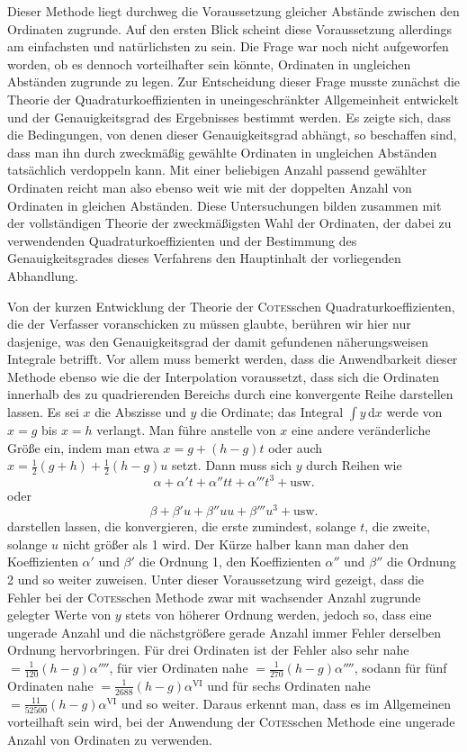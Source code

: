 Dieser Methode liegt durchweg die Voraussetzung gleicher Abstände zwischen den Ordinaten zugrunde. Auf den ersten Blick scheint diese Voraussetzung allerdings am einfachsten und natürlichsten zu sein. Die Frage war noch nicht aufgeworfen worden, ob es dennoch vorteilhafter sein könnte, Ordinaten in ungleichen Abständen zugrunde zu legen. Zur Entscheidung dieser Frage musste zunächst die Theorie der Quadraturkoeffizienten in uneingeschränkter Allgemeinheit entwickelt und der Genauigkeitsgrad des Ergebnisses bestimmt werden. Es zeigte sich, dass die Bedingungen, von denen dieser Genauigkeitsgrad abhängt, so beschaffen sind, dass man ihn durch zweckmäßig gewählte Ordinaten in ungleichen Abständen tatsächlich verdoppeln kann. Mit einer beliebigen Anzahl passend gewählter Ordinaten reicht man also ebenso weit wie mit der doppelten Anzahl von Ordinaten in gleichen Abständen. Diese Untersuchungen bilden zusammen mit der vollständigen Theorie der zweckmäßigsten Wahl der Ordinaten, der dabei zu verwendenden Quadraturkoeffizienten und der Bestimmung des Genauigkeitsgrades dieses Verfahrens den Hauptinhalt der vorliegenden Abhandlung.

Von der kurzen Entwicklung der Theorie der \textsc{Cotes}schen Quadraturkoeffizienten, die der Verfasser voranschicken zu müssen glaubte, berühren wir hier nur dasjenige, was den Genauigkeitsgrad der damit gefundenen näherungsweisen Integrale betrifft. Vor allem muss bemerkt werden, dass die Anwendbarkeit dieser Methode ebenso wie die der Interpolation voraussetzt, dass sich die Ordinaten innerhalb des zu quadrierenden Bereichs
durch eine konvergente Reihe darstellen lassen. Es sei \(x\) die Abszisse und \(y\) die Ordinate; das Integral \(\int y\,\mathrm{d}x\) werde von \(x=g\) bis \(x=h\) verlangt. Man führe anstelle von \(x\) eine andere veränderliche Größe ein, indem man etwa \(x=g+(h-g)t\) oder auch \(x=\frac12(g+h)+\frac12(h-g)u\) setzt. Dann muss sich \(y\) durch Reihen wie
\[
\alpha+\alpha't+\alpha''tt+\alpha'''t^3+\text{usw.}
\]
oder
\[
\beta+\beta'u+\beta''uu+\beta'''u^3+\text{usw.}
\]
darstellen lassen, die konvergieren, die erste zumindest, solange \(t\), die zweite, solange \(u\) nicht größer als 1 wird. Der Kürze halber kann man daher den Koeffizienten \(\alpha'\) und \(\beta'\) die Ordnung 1, den Koeffizienten \(\alpha''\) und \(\beta''\) die Ordnung 2 und so weiter zuweisen. Unter dieser Voraussetzung wird gezeigt, dass die Fehler bei der \textsc{Cotes}schen Methode zwar mit wachsender Anzahl zugrunde gelegter Werte von \(y\) stets von höherer Ordnung werden, jedoch so, dass eine ungerade Anzahl und die nächstgrößere gerade Anzahl immer Fehler derselben Ordnung hervorbringen. Für drei Ordinaten ist der Fehler also sehr nahe \(=\frac{1}{120}(h-g)\alpha''''\), für vier Ordinaten nahe \(=\frac{1}{270}(h-g)\alpha''''\), sodann für fünf Ordinaten nahe \(=\frac{1}{2688}(h-g)\alpha^{\mathrm{VI}}\) und für sechs Ordinaten nahe \(=\frac{11}{52500}(h-g)\alpha^{\mathrm{VI}}\) und so weiter. Daraus erkennt man, dass es im Allgemeinen vorteilhaft sein wird, bei der Anwendung der \textsc{Cotes}schen Methode eine ungerade Anzahl von Ordinaten zu verwenden.

